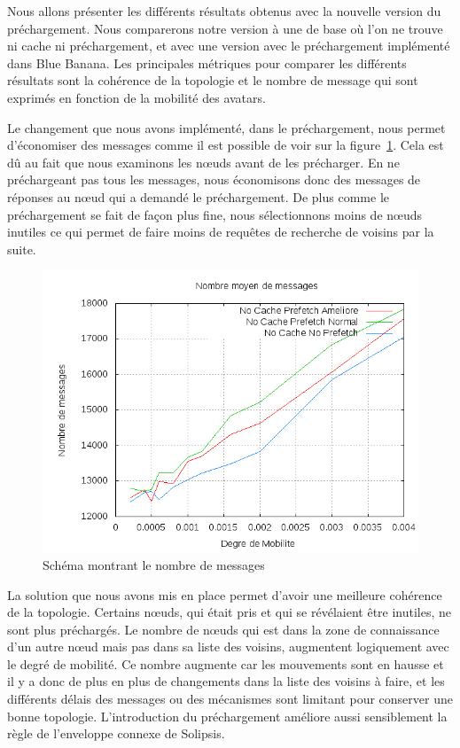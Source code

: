 Nous allons présenter les différents résultats obtenus avec la nouvelle version du préchargement. Nous comparerons notre version à une de base où l'on ne trouve ni cache ni préchargement, et avec une version avec le préchargement implémenté dans Blue Banana. Les principales métriques pour comparer les différents résultats sont la cohérence de la topologie et le nombre de message qui sont exprimés en fonction de la mobilité des avatars.

\par Le changement que nous avons implémenté, dans le préchargement, nous permet d'économiser des messages comme il est possible de voir sur la figure~\ref{courbeNbMessPrefetch}. Cela est dû au fait que nous examinons les nœuds avant de les précharger. En ne préchargeant pas tous les messages, nous économisons donc des messages de réponses au nœud qui a demandé le préchargement. De plus comme le préchargement se fait de façon plus fine, nous sélectionnons moins de nœuds inutiles ce qui permet de faire moins de requêtes de recherche de voisins par la suite.
	\begin{figure}[!h]
        \centering
        \includegraphics[scale=0.5]{../CacheCode/SolipsisPeersim/resultats/Courbes/Courbes_Final_Rapport/Nombre_Messages_Prefetchs.png}
        \caption{Schéma montrant le nombre de messages}
        \label{courbeNbMessPrefetch}
        \end{figure}

\par La solution que nous avons mis en place permet d'avoir une meilleure cohérence de la topologie. Certains nœuds, qui était pris et qui se révélaient être inutiles, ne sont plus préchargés. Le nombre de nœuds qui est dans la zone de connaissance d'un autre nœud mais pas dans sa liste des voisins, augmentent logiquement avec le degré de mobilité. Ce nombre augmente car les mouvements sont en hausse et il y a donc de plus en plus de changements dans la liste des voisins à faire, et les différents délais des messages ou des mécanismes sont limitant pour conserver une bonne topologie. L'introduction du préchargement améliore aussi sensiblement la règle de l'enveloppe connexe de Solipsis.

